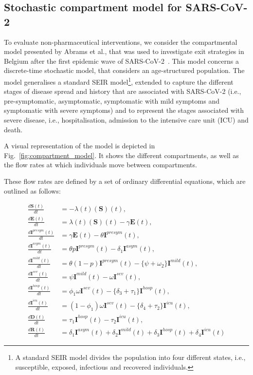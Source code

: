 \documentclass{article}
\renewcommand{\cite}[1]{\citep{#1}}
\begin{document}
\subsection{Stochastic compartment model for SARS-CoV-2}
\label{sec:sars-cov2-momdp_model}
To evaluate non-pharmaceutical interventions, we consider the compartmental model presented by Abrams et al., that was used to investigate exit strategies in Belgium after the first epidemic wave of SARS-CoV-2~\cite{abrams2021modelling}. This model concerns a discrete-time stochastic model, that considers an age-structured population. The model generalises a standard SEIR model\footnote{A standard SEIR model divides the population into four different states, i.e., susceptible, exposed, infectious and recovered individuals.}, extended to capture the different stages of disease spread and history that are associated with SARS-CoV-2 (i.e., pre-symptomatic, asymptomatic, symptomatic with mild symptoms and symptomatic with severe symptoms) and to represent the stages associated with severe disease, i.e., hospitalisation, admission to the intensive care unit (ICU) and death.

A visual representation of the model is depicted in Fig.~\ref{fig:compartment_model}. It shows the different compartments, as well as the flow rates at which individuals move between compartments.

These flow rates are defined by a set of ordinary differential equations, which are outlined as follows:

\begin{align*}
\frac{d\textbf{S}(t)}{dt} & = -\lambda(t)(\textbf{S})(t), \\
%
\frac{d\textbf{E}(t)}{dt} & = \lambda(t)(\textbf{S})(t) - \gamma \textbf{E}(t), \\
%
\frac{d\textbf{I}^{presym}(t)}{dt} & = \gamma \textbf{E}(t) - \theta \textbf{I}^{presym}(t), \\
%
\frac{d\textbf{I}^{asym}(t)}{dt} & = \theta p \textbf{I}^{presym}(t) - \delta_{1} \textbf{I}^{asym}(t), \\
%
\frac{d\textbf{I}^{mild}(t)}{dt} & = \theta (1 - p) \textbf{I}^{presym}(t) - \{ \psi + \omega_{2} \} \textbf{I}^{mild}(t), \\
%
\frac{d\textbf{I}^{sev}(t)}{dt} & = \psi \textbf{I}^{mild}(t) - \omega \textbf{I}^{sev}(t), \\
%
\frac{d\textbf{I}^{hosp}(t)}{dt} & = \phi_{1} \omega \textbf{I}^{sev}(t) - \{ \delta_{3} + \tau_{1} \} \textbf{I}^{hosp}(t), \\
%
\frac{d\textbf{I}^{icu}(t)}{dt} & = (1 - \phi_1) \omega \textbf{I}^{sev}(t) - \{ \delta_{4} + \tau_{2} \} \textbf{I}^{icu}(t), \\
%
\frac{d\textbf{D}(t)}{dt} & = \tau_{1} \textbf{I}^{hosp}(t) - \tau_{2} \textbf{I}^{icu}(t), \\
%
\frac{d\textbf{R}(t)}{dt} & = \delta_{1} \textbf{I}^{asym}(t) + \delta_{2} \textbf{I}^{mild}(t) + \delta_{3} \textbf{I}^{hosp}(t) + \delta_{4} \textbf{I}^{icu}(t)
\end{align*}
%
\end{document}
